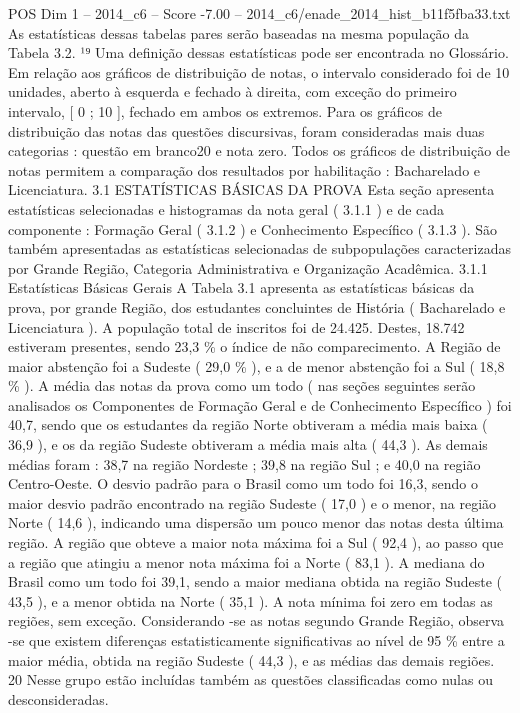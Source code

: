 \begin{textsample}{POS Dim 1 – 2014\_c6 – Score -7.00 – 2014\_c6/enade\_2014\_hist\_b11f5fba33.txt}
As estatísticas dessas tabelas pares serão baseadas na mesma população da Tabela 3.2. ¹⁹ Uma definição dessas estatísticas pode ser encontrada no Glossário.
Em relação aos gráficos de distribuição de notas, o intervalo considerado foi de 10 unidades, aberto à esquerda e fechado à direita, com exceção do primeiro intervalo, [ 0 ; 10 ], fechado em ambos os extremos.
Para os gráficos de distribuição das notas das questões discursivas, foram consideradas mais duas categorias : questão em branco20 e nota zero.
Todos os gráficos de distribuição de notas permitem a comparação dos resultados por habilitação : Bacharelado e Licenciatura. 3.1 ESTATÍSTICAS BÁSICAS DA PROVA Esta seção apresenta estatísticas selecionadas e histogramas da nota geral ( 3.1.1 ) e de cada componente : Formação Geral ( 3.1.2 ) e Conhecimento Específico ( 3.1.3 ).
São também apresentadas as estatísticas selecionadas de subpopulações caracterizadas por Grande Região, Categoria Administrativa e Organização Acadêmica. 3.1.1 Estatísticas Básicas Gerais A Tabela 3.1 apresenta as estatísticas básicas da prova, por grande Região, dos estudantes concluintes de História ( Bacharelado e Licenciatura ).
A população total de inscritos foi de 24.425.
Destes, 18.742 estiveram presentes, sendo 23,3 \% o índice de não comparecimento.
A Região de maior abstenção foi a Sudeste ( 29,0 \% ), e a de menor abstenção foi a Sul ( 18,8 \% ).
A média das notas da prova como um todo ( nas seções seguintes serão analisados os Componentes de Formação Geral e de Conhecimento Específico ) foi 40,7, sendo que os estudantes da região Norte obtiveram a média mais baixa ( 36,9 ), e os da região Sudeste obtiveram a média mais alta ( 44,3 ).
As demais médias foram : 38,7 na região Nordeste ; 39,8 na região Sul ; e 40,0 na região Centro-Oeste.
O desvio padrão para o Brasil como um todo foi 16,3, sendo o maior desvio padrão encontrado na região Sudeste ( 17,0 ) e o menor, na região Norte ( 14,6 ), indicando uma dispersão um pouco menor das notas desta última região.
A região que obteve a maior nota máxima foi a Sul ( 92,4 ), ao passo que a região que atingiu a menor nota máxima foi a Norte ( 83,1 ).
A mediana do Brasil como um todo foi 39,1, sendo a maior mediana obtida na região Sudeste ( 43,5 ), e a menor obtida na Norte ( 35,1 ).
A nota mínima foi zero em todas as regiões, sem exceção.
Considerando -se as notas segundo Grande Região, observa -se que existem diferenças estatisticamente significativas ao nível de 95 \% entre a maior média, obtida na região Sudeste ( 44,3 ), e as médias das demais regiões. 20 Nesse grupo estão incluídas também as questões classificadas como nulas ou desconsideradas.

\end{textsample}
